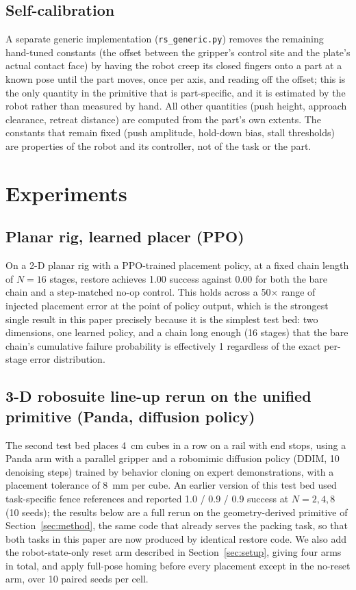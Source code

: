 \documentclass[11pt]{article}
\begin{document}
\subsection{Self-calibration}
A separate generic implementation (\texttt{rs\_generic.py}) removes the
remaining hand-tuned constants (the offset between the gripper's control
site and the plate's actual contact face) by having the robot creep its
closed fingers onto a part at a known pose until the part moves, once per
axis, and reading off the offset; this is the only quantity in the
primitive that is part-specific, and it is estimated by the robot rather
than measured by hand. All other quantities (push height, approach
clearance, retreat distance) are computed from the part's own extents. The
constants that remain fixed (push amplitude, hold-down bias, stall
thresholds) are properties of the robot and its controller, not of the task
or the part.

\section{Experiments}

\subsection{Planar rig, learned placer (PPO)}
\label{sec:planar}
On a 2-D planar rig with a PPO-trained placement policy, at a fixed chain
length of $N=16$ stages, restore achieves 1.00 success against 0.00 for
both the bare chain and a step-matched no-op control. This holds across a
50$\times$ range of injected placement error at the point of policy output,
which is the strongest single result in this paper precisely because it is
the simplest test bed: two dimensions, one learned policy, and a chain long
enough (16 stages) that the bare chain's cumulative failure probability is
effectively 1 regardless of the exact per-stage error distribution.

\subsection{3-D robosuite line-up rerun on the unified primitive (Panda, diffusion policy)}
\label{sec:lineup-rerun}
The second test bed places 4~cm cubes in a row on a rail with end stops,
using a Panda arm with a parallel gripper and a robomimic diffusion policy
(DDIM, 10 denoising steps) trained by behavior cloning on expert
demonstrations, with a placement tolerance of 8~mm per cube. An earlier
version of this test bed used task-specific fence references and reported
1.0 / 0.9 / 0.9 success at $N = 2,4,8$ (10 seeds); the results below are a
full rerun on the geometry-derived primitive of Section~\ref{sec:method},
the same code that already serves the packing task, so that both tasks in
this paper are now produced by identical restore code. We also add the
robot-state-only reset arm described in Section~\ref{sec:setup}, giving four
arms in total, and apply full-pose homing before every placement except in
the no-reset arm, over 10 paired seeds per cell.
\end{document}
